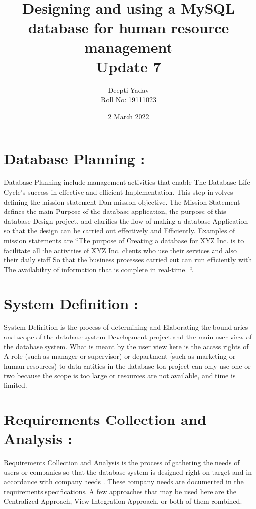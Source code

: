 \documentclass{article}
\title{ Designing and using a MySQL database for human resource management\\ Update 7}
\date{2 March 2022}
\author{Deepti Yadav\\ Roll No: 19111023 }
\begin{document}
\maketitle
\section*{Database Planning : }Database Planning include management activities that enable The Database
Life Cycle’s success in effective and efficient Implementation. This step involves defining the mission statement Dan mission objective. The Mission
Statement defines the main Purpose of the database application, the purpose
of this database Design project, and clarifies the flow of making a database
Application so that the design can be carried out effectively and Efficiently.
Examples of mission statements are “The purpose of Creating a database for
XYZ Inc. is to facilitate all the activities of XYZ Inc. clients who use their
services and also their daily staff So that the business processes carried out
can run efficiently with The availability of information that is complete in
real-time. “.
\\
\section*{System Definition : }System Definition is the process of determining and Elaborating the boundaries and scope of the database system Development project and the main
user view of the database system. What is meant by the user view here is
the access rights of A role (such as manager or supervisor) or department
(such as marketing or human resources) to data entities in the database toa
project can only use one or two because the scope is too large or resources
are not available, and time is limited.
\\
\section*{Requirements Collection and Analysis : }Requirements Collection and Analysis is the process of gathering the needs of
users or companies so that the database system is designed right on target and
in accordance with company needs . These company needs are documented
in the requirements specifications. A few approaches that may be used here
are the Centralized Approach, View Integration Approach, or both of them
combined.
\end{document}
